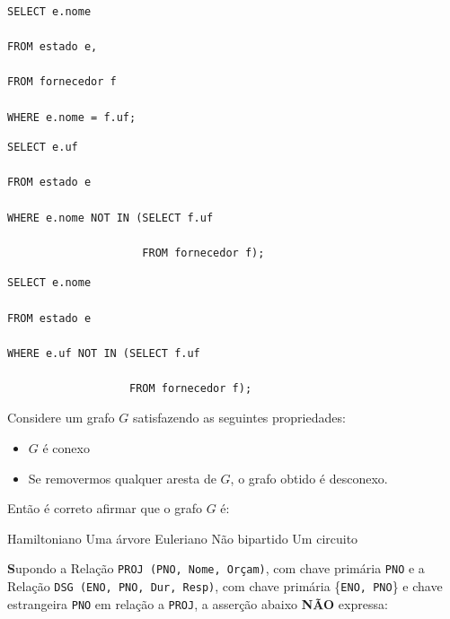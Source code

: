\documentclass[12pt, addpoints]{exam}
\begin{document}
\begin{questions}
\begin{choices}
\begin{verbatim}
\end{verbatim}


\choice \begin{verbatim}SELECT e.nome

FROM estado e,

FROM fornecedor f

WHERE e.nome = f.uf;

\end{verbatim}


\choice \begin{verbatim}SELECT e.uf

FROM estado e

WHERE e.nome NOT IN (SELECT f.uf

                     FROM fornecedor f);

\end{verbatim}
\choice \begin{verbatim}SELECT e.nome

FROM estado e

WHERE e.uf NOT IN (SELECT f.uf

                   FROM fornecedor f);

\end{verbatim}


\end{choices}

\question

Considere um grafo \( G \) satisfazendo as seguintes propriedades:



\begin{itemize}

    \item \( G \) é conexo

    \item Se removermos qualquer aresta de \( G \), o grafo obtido é desconexo.

\end{itemize}



Então é correto afirmar que o grafo \( G \) é:
\begin{choices}
\choice Hamiltoniano
\choice Uma árvore
\choice Euleriano
\choice Não bipartido
\choice Um circuito
\end{choices}

\question

\textbf Supondo a Relação \texttt{PROJ (PNO, Nome, Orçam)}, com chave primária \texttt{PNO} e a Relação \texttt{DSG (ENO, PNO, Dur, Resp)}, com chave primária \{\texttt{ENO, PNO}\} e chave estrangeira \texttt{PNO} em relação a \texttt{PROJ}, a asserção abaixo \textbf{NÃO} expressa:




\end{questions}
\end{document}

